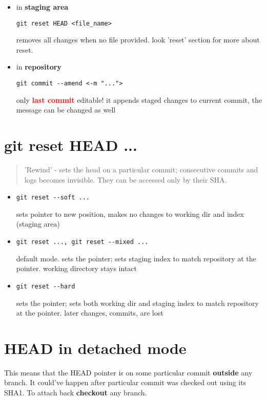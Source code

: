 \documentclass{report}
\begin{document}
\begin{itemize}
\item in \textbf{staging area}
\begin{verbatim}
git reset HEAD <file_name>
\end{verbatim}
removes all changes when no file provided. look 'reset' section for more about reset.

\item in \textbf{repository}
\begin{verbatim}
git commit --amend <-m "...">
\end{verbatim}
only \textcolor{red}{\textbf{last commit}} editable! it appends staged changes to current commit, the message can be changed as well
\end{itemize}


\section{git reset HEAD ...}
\begin{quotation}
'Rewind' - sets the head on a particular commit; consecutive commits and logs becomes invisible. They can be accessed only by their SHA.
\end{quotation}
\begin{itemize}
\item \begin{verbatim}
git reset --soft ...
\end{verbatim}
sets pointer to new position, makes no changes to working dir and index (staging area)

\item \begin{verbatim}
git reset ..., git reset --mixed ...
\end{verbatim}
default mode. sets the pointer; sets staging index to match repository at the pointer. working directory stays intact

\item \begin{verbatim}
git reset --hard
\end{verbatim}
sets the pointer; sets both working dir and staging index to match repository at the pointer. later changes, commits, are lost
\end{itemize}


\section{HEAD in detached mode}
This means that the HEAD pointer is on some particular commit \textbf{outside} any branch. It could've happen after particular commit was checked out using its SHA1. To attach back \textbf{checkout} any branch.
\end{document}
